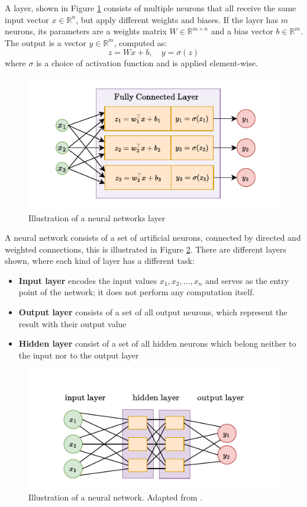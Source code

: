 A layer, shown in Figure \ref{fig:layer} consists of multiple neurons that all receive the same input vector $x\in\mathbb{R}^n$, but apply different weights and biases.
If the layer has $m$ neurons, its parameters are a weights matrix $W\in\mathbb{R}^{m\times n}$ and a bias vector $b\in \mathbb{R}^m$. The output is a vector $y \in \mathbb{R}^m$, computed as:
\[z=Wx+b, \quad y=\sigma(z)\]
where $\sigma$ is a choice of activation function and is applied element-wise. 

\begin{figure}[H]
    \centering
    \includegraphics[width=0.7\linewidth]{Abschlussarbeit/Pictures/Layer_outp.pdf}
    \caption{Illustration of a neural networks layer}
    \label{fig:layer}
\end{figure}



A neural network consists of a set of artificial neurons, connected by directed and weighted connections, this is illustrated in Figure \ref{fig:IlNN}.
There are different layers shown, where each kind of layer has a different task: 
\begin{itemize}
   \item \textbf{Input layer} encodes the input values \( x_1, x_2, \dots, x_n \) and serves as the entry point of the network; it does not perform any computation itself.
    \item \textbf{Output layer} consists of a set of all output neurons, which represent the result with their output value
    \item \textbf{Hidden layer} consist of a set of all hidden neurons which belong neither to the input nor to the output layer
\end{itemize}


\begin{figure}[h]
    \centering
    \includegraphics[width=0.7\linewidth]{Abschlussarbeit/Pictures/NN_mathematischausgerichtet.pdf}
    \caption{Illustration of a neural network. Adapted from \cite{zhou_machine_2021}.}
    \label{fig:IlNN}
\end{figure}


